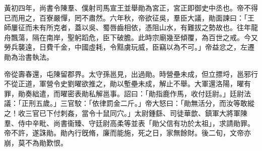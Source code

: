 \begin{pinyinscope}
 
 
 
 黃初四年，尚書令陳羣、僕射司馬宣王並舉勛為宮正，宮正即御史中丞也。帝不得已而用之，百寮嚴憚，罔不肅然。六年秋，帝欲征吳，羣臣大議，勛面諫曰：「王師屢征而未有所克者，蓋以吳、蜀唇齒相依，憑阻山水，有難拔之勢故也。往年龍舟飄蕩，隔在南岸，聖躬蹈危，臣下破膽。此時宗廟幾至傾覆，為百世之戒。今又勞兵襲遠，日費千金，中國虛耗，令黠虜玩威，臣竊以為不可。」帝益忿之，左遷勛為治書執法。
 
 
 
 
 帝從壽春還，屯陳留郡界。太守孫邕見，出過勛。時營壘未成，但立摽埒，邕邪行不從正道，軍營令史劉曜欲推之，勛以塹壘未成，解止不舉。大軍還洛陽，曜有罪，勛奏絀遣，而曜密表勛私解邕事。詔曰：「勛指鹿作馬，收付廷尉。」廷尉法議：「正刑五歲。」三官駮：「依律罰金二斤。」帝大怒曰：「勛無活分，而汝等敢縱之！收三官已下付刺姦，當令十鼠同穴。」太尉鍾繇、司徒華歆、鎮軍大將軍陳羣、侍中辛毗、尚書衞臻、守廷尉高柔等並表「勛父信有功於太祖」，求請勛罪。帝不許，遂誅勛。勛內行旣脩，廉而能施，死之日，家無餘財。後二旬，文帝亦崩，莫不為勛歎恨。
 
 
\end{pinyinscope}